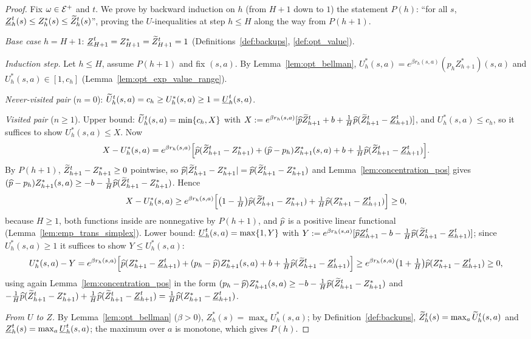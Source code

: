 \begin{proof}
\leanok
Fix $\omega \in \mathcal{E}^+$ and $t$. We prove by backward induction on $h$ (from $H + 1$ down to
$1$) the statement $P(h)$: ``for all $s$, $\underline{Z}_h^t(s) \le Z^*_h(s) \le \widetilde{Z}_h^t(s)$'', proving the
$U$-inequalities at step $h \le H$ along the way from $P(h+1)$.

\emph{Base case} $h = H + 1$: $\underline{Z}_{H+1}^t = Z^*_{H+1} = \widetilde{Z}_{H+1}^t = 1$
(Definitions~\ref{def:backups}, \ref{def:opt_value}).

\emph{Induction step.} Let $h \le H$, assume $P(h+1)$ and fix $(s,a)$. By
Lemma~\ref{lem:opt_bellman}, $U^*_h(s,a) = e^{\beta r_h(s,a)} (p_h Z^*_{h+1})(s,a)$ and
$U^*_h(s,a) \in [1, c_h]$ (Lemma~\ref{lem:opt_exp_value_range}).

\emph{Never-visited pair} ($n = 0$): $\widetilde{U}_h^t(s,a) = c_h \ge U^*_h(s,a) \ge 1 = \underline{U}_h^t(s,a)$.

\emph{Visited pair} ($n \ge 1$). Upper bound: $\widetilde{U}_h^t(s,a) = \min\{c_h, X\}$ with
$X := e^{\beta r_h(s,a)}[\widehat{p}\widetilde{Z}^t_{h+1} + b + \frac1H\widehat{p}(\widetilde{Z}^t_{h+1} - \underline{Z}^t_{h+1})]$, and
$U^*_h(s,a) \le c_h$, so it suffices to show $U^*_h(s,a) \le X$. Now
\[
  X - U^*_h(s,a) = e^{\beta r_h(s,a)}\Big[ \widehat{p}(\widetilde{Z}^t_{h+1} - Z^*_{h+1}) + (\widehat{p} - p_h)Z^*_{h+1}(s,a)
  + b + \tfrac1H \widehat{p}(\widetilde{Z}^t_{h+1} - \underline{Z}^t_{h+1}) \Big].
\]
By $P(h+1)$, $\widetilde{Z}^t_{h+1} - Z^*_{h+1} \ge 0$ pointwise, so
$\widehat{p}\lvert \widetilde{Z}^t_{h+1} - Z^*_{h+1} \rvert = \widehat{p}(\widetilde{Z}^t_{h+1} - Z^*_{h+1})$ and
Lemma~\ref{lem:concentration_pos} gives
$(\widehat{p} - p_h)Z^*_{h+1}(s,a) \ge -b - \frac1H\widehat{p}(\widetilde{Z}^t_{h+1} - Z^*_{h+1})$. Hence
\[
  X - U^*_h(s,a) \ge e^{\beta r_h(s,a)}\Big[\big(1 - \tfrac1H\big)\widehat{p}(\widetilde{Z}^t_{h+1} - Z^*_{h+1})
  + \tfrac1H \widehat{p}(Z^*_{h+1} - \underline{Z}^t_{h+1})\Big] \ge 0 ,
\]
because $H \ge 1$, both functions inside are nonnegative by $P(h+1)$, and $\widehat{p}$ is a
positive linear functional (Lemma~\ref{lem:emp_trans_simplex}). Lower bound:
$\underline{U}_h^t(s,a) = \max\{1, Y\}$ with
$Y := e^{\beta r_h(s,a)}[\widehat{p}\underline{Z}^t_{h+1} - b - \frac1H\widehat{p}(\widetilde{Z}^t_{h+1} - \underline{Z}^t_{h+1})]$; since
$U^*_h(s,a) \ge 1$ it suffices to show $Y \le U^*_h(s,a)$:
\[
  U^*_h(s,a) - Y = e^{\beta r_h(s,a)}\Big[\widehat{p}(Z^*_{h+1} - \underline{Z}^t_{h+1}) + (p_h - \widehat{p})Z^*_{h+1}(s,a)
  + b + \tfrac1H\widehat{p}(\widetilde{Z}^t_{h+1} - \underline{Z}^t_{h+1})\Big]
  \ge e^{\beta r_h(s,a)}\big(1 + \tfrac1H\big)\widehat{p}(Z^*_{h+1} - \underline{Z}^t_{h+1}) \ge 0,
\]
using again Lemma~\ref{lem:concentration_pos} in the form
$(p_h - \widehat{p})Z^*_{h+1}(s,a) \ge -b - \frac1H\widehat{p}(\widetilde{Z}^t_{h+1} - Z^*_{h+1})$ and
$-\frac1H\widehat{p}(\widetilde{Z}^t_{h+1} - Z^*_{h+1}) + \frac1H\widehat{p}(\widetilde{Z}^t_{h+1} - \underline{Z}^t_{h+1}) = \frac1H\widehat{p}(Z^*_{h+1} - \underline{Z}^t_{h+1})$.

\emph{From $U$ to $Z$.} By Lemma~\ref{lem:opt_bellman} ($\beta > 0$), $Z^*_h(s) = \max_a U^*_h(s,a)$;
by Definition~\ref{def:backups}, $\widetilde{Z}_h^t(s) = \max_a\widetilde{U}_h^t(s,a)$ and $\underline{Z}_h^t(s) = \max_a \underline{U}_h^t(s,a)$;
the maximum over $a$ is monotone, which gives $P(h)$.
\end{proof}

